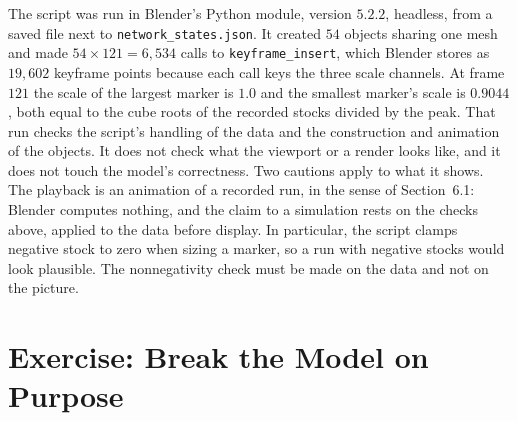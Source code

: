 

The script was run in Blender's Python module, version $5.2.2$, headless, from a saved file next to \texttt{network\_states.json}. It created $54$ objects sharing one mesh and made $54\times121=6{,}534$ calls to \texttt{keyframe\_insert}, which Blender stores as $19{,}602$ keyframe points because each call keys the three scale channels. At frame $121$ the scale of the largest marker is $1.0$ and the smallest marker's scale is $0.9044$, both equal to the cube roots of the recorded stocks divided by the peak. That run checks the script's handling of the data and the construction and animation of the objects. It does not check what the viewport or a render looks like, and it does not touch the model's correctness. Two cautions apply to what it shows. The playback is an animation of a recorded run, in the sense of Section~6.1: Blender computes nothing, and the claim to a simulation rests on the checks above, applied to the data before display. In particular, the script clamps negative stock to zero when sizing a marker, so a run with negative stocks would look plausible. The nonnegativity check must be made on the data and not on the picture.

\section{Exercise: Break the Model on Purpose}

